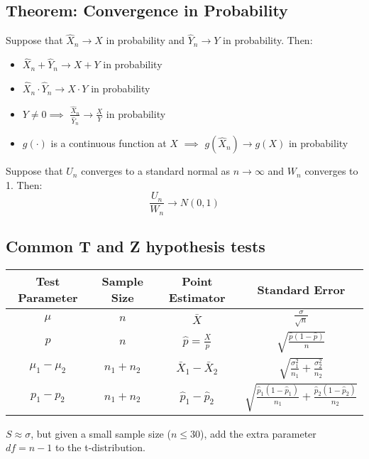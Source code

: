 \documentclass[sn-mathphys,Numbered]{sn-jnl}%
\begin{document}
\subsection*{Theorem: Convergence in Probability}
Suppose that $\hat X_n \to X$ in probability and $\hat Y_n \to Y$ in
probability. Then:
\begin{itemize}
    \item $\hat X_n + \hat Y_n \to X + Y$ in probability\\
    \item $\hat X_n \cdot \hat Y_n \to X \cdot Y$ in probability\\
    \item $Y \ne 0 \implies $ $\frac{\hat X_n}{\hat Y_n} \to \frac{X}{Y}$ in probability\\
    \item $g(\cdot)$ is a continuous function at $X$ $\implies$ $g(\hat X_n) \to g(X)$ in
          probability
\end{itemize}
Suppose that $U_n$ converges to a standard normal as $n \to \infty$ and $W_n$ converges to 1. Then:
\begin{equation}
    \frac{U_n}{W_n} \to N(0, 1)
\end{equation}

\subsection*{Common T and Z hypothesis tests}
\bgroup
\begin{center}
    \def\arraystretch{2}
    \begin{tabular}{ c|c|c|c }
        \toprule
        Test Parameter  & Sample Size & Point Estimator        & Standard Error                                                               \\
        \midrule
        $\mu$           & $n$         & $\bar X$               & $\frac{\sigma}{\sqrt{n}}$                                                    \\
        $p$             & $n$         & $\hat p = \frac{X}{p}$ & $\sqrt{\frac{\hat p(1-\hat p)}{n}}$                                          \\
        $\mu_1 - \mu_2$ & $n_1 + n_2$ & $\bar X_1 - \bar X_2$  & $\sqrt{\frac{\sigma_1^2}{n_1} + \frac{\sigma_2^2}{n_2}}$                     \\
        $p_1 - p_2$     & $n_1 + n_2$ & $\hat p_1 - \hat p_2$  & $\sqrt{\frac{\hat p_1(1-\hat p_1)}{n_1} + \frac{\hat p_2(1-\hat p_2)}{n_2}}$ \\
        \bottomrule
    \end{tabular}
\end{center}
\egroup
$S\approx \sigma$, but given a small sample size ($n \le 30$), add the extra parameter $df = n-1$ to the t-distribution.
\end{document}
